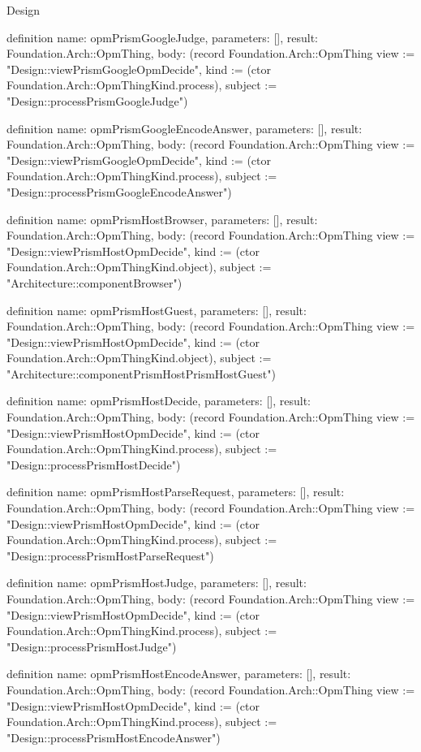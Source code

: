 \begin{lexlean}{Design}
\begin{semanticmodule}
definition{
  name: opmPrismGoogleJudge,
  parameters: [],
  result: Foundation.Arch::OpmThing,
  body: (record Foundation.Arch::OpmThing {view := "Design::viewPrismGoogleOpmDecide", kind := (ctor Foundation.Arch::OpmThingKind.process), subject := "Design::processPrismGoogleJudge"})
}

definition{
  name: opmPrismGoogleEncodeAnswer,
  parameters: [],
  result: Foundation.Arch::OpmThing,
  body: (record Foundation.Arch::OpmThing {view := "Design::viewPrismGoogleOpmDecide", kind := (ctor Foundation.Arch::OpmThingKind.process), subject := "Design::processPrismGoogleEncodeAnswer"})
}

definition{
  name: opmPrismHostBrowser,
  parameters: [],
  result: Foundation.Arch::OpmThing,
  body: (record Foundation.Arch::OpmThing {view := "Design::viewPrismHostOpmDecide", kind := (ctor Foundation.Arch::OpmThingKind.object), subject := "Architecture::componentBrowser"})
}

definition{
  name: opmPrismHostGuest,
  parameters: [],
  result: Foundation.Arch::OpmThing,
  body: (record Foundation.Arch::OpmThing {view := "Design::viewPrismHostOpmDecide", kind := (ctor Foundation.Arch::OpmThingKind.object), subject := "Architecture::componentPrismHostPrismHostGuest"})
}

definition{
  name: opmPrismHostDecide,
  parameters: [],
  result: Foundation.Arch::OpmThing,
  body: (record Foundation.Arch::OpmThing {view := "Design::viewPrismHostOpmDecide", kind := (ctor Foundation.Arch::OpmThingKind.process), subject := "Design::processPrismHostDecide"})
}

definition{
  name: opmPrismHostParseRequest,
  parameters: [],
  result: Foundation.Arch::OpmThing,
  body: (record Foundation.Arch::OpmThing {view := "Design::viewPrismHostOpmDecide", kind := (ctor Foundation.Arch::OpmThingKind.process), subject := "Design::processPrismHostParseRequest"})
}

definition{
  name: opmPrismHostJudge,
  parameters: [],
  result: Foundation.Arch::OpmThing,
  body: (record Foundation.Arch::OpmThing {view := "Design::viewPrismHostOpmDecide", kind := (ctor Foundation.Arch::OpmThingKind.process), subject := "Design::processPrismHostJudge"})
}

definition{
  name: opmPrismHostEncodeAnswer,
  parameters: [],
  result: Foundation.Arch::OpmThing,
  body: (record Foundation.Arch::OpmThing {view := "Design::viewPrismHostOpmDecide", kind := (ctor Foundation.Arch::OpmThingKind.process), subject := "Design::processPrismHostEncodeAnswer"})
}


\end{semanticmodule}
\end{lexlean}

